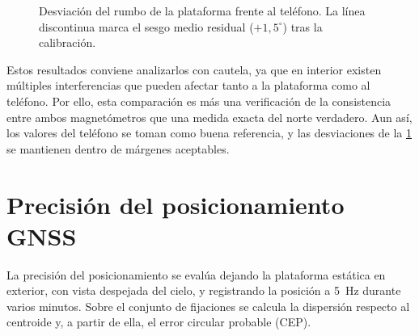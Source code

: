 \begin{figure}[H]
    \centering
    \caption{Desviaci\'on del rumbo de la plataforma frente al tel\'efono. La l\'inea discontinua marca el
             sesgo medio residual ($+1{,}5^\circ$) tras la calibraci\'on.}
    \label{fig:val_rumbo_scatter}
\end{figure}

Estos resultados conviene analizarlos con cautela, ya que en interior existen múltiples interferencias que pueden afectar tanto a la plataforma como al teléfono. Por ello, esta comparación es más una verificación de la consistencia entre ambos magnetómetros que una medida exacta del norte verdadero. Aun así, los valores del teléfono se toman como buena referencia, y las desviaciones de la \cref{fig:val_rumbo_scatter} se mantienen dentro de márgenes aceptables.


\section{Precisión del posicionamiento GNSS}
\label{sec:val_gnss}

La precisión del posicionamiento se evalúa dejando la plataforma estática en
exterior, con vista despejada del cielo, y registrando la posición a \SI{5}{\hertz}
durante varios minutos. Sobre el conjunto de fijaciones se calcula la dispersión
respecto al centroide y, a partir de ella, el error circular probable (CEP).

